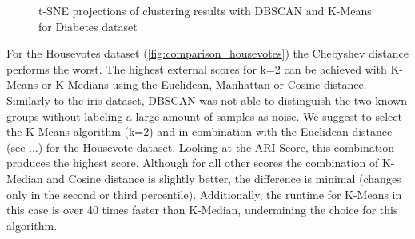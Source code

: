 \begin{figure}[H]
	\caption{t-SNE projections of clustering results with DBSCAN and K-Means for Diabetes dataset}
	\label{fig:diabetestsne}
\end{figure}
 

For the Housevotes dataset (\autoref{fig:comparison_housevotes}) the Chebyshev distance performs the worst. The highest external scores for k=2 can be achieved with K-Means or K-Medians using the Euclidean, Manhattan or Cosine distance. Similarly to the iris dataset, DBSCAN was not able to distinguish the two known groups without labeling a large amount of samples as noise. We suggest to select the K-Means algorithm (k=2) and in combination with the Euclidean distance (see ...) for the Housevote dataset. Looking at the ARI Score, this combination produces the highest score. Although for all other scores the combination of K-Median and Cosine distance is slightly better, the difference is minimal (changes only in the second or third percentile). Additionally, the runtime for K-Means in this case is over 40 times faster than K-Median, undermining the choice for this algorithm.

